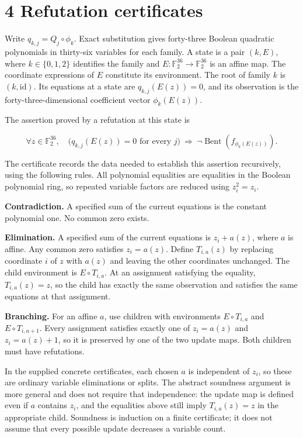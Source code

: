 \documentclass[11pt,a4paper]{article}
\begin{document}
\section*{4 Refutation certificates}

Write $q_{k,j}=Q_j\circ\phi_k$. Exact substitution gives forty-three Boolean quadratic polynomials in thirty-six variables for each family. A state is a pair $(k,E)$, where $k\in\{0,1,2\}$ identifies the family and $E:\mathbb F_2^{36}\to\mathbb F_2^{36}$ is an affine map. The coordinate expressions of $E$ constitute its environment. The root of family $k$ is $(k,\mathrm{id})$. Its equations at a state are $q_{k,j}(E(z))=0$, and its observation is the forty-three-dimensional coefficient vector $\phi_k(E(z))$.

The assertion proved by a refutation at this state is

\[
\forall z\in\mathbb F_2^{36},\quad
\bigl(q_{k,j}(E(z))=0\text{ for every }j\bigr)
\ \Longrightarrow\ \neg\operatorname{Bent}(f_{\phi_k(E(z))}).
\]

The certificate records the data needed to establish this assertion recursively, using the following rules. All polynomial equalities are equalities in the Boolean polynomial ring, so repeated variable factors are reduced using $z_i^2=z_i$.

\textbf{Contradiction.} A specified sum of the current equations is the constant polynomial one. No common zero exists.

\textbf{Elimination.} A specified sum of the current equations is $z_i+a(z)$, where $a$ is affine. Any common zero satisfies $z_i=a(z)$. Define $T_{i,a}(z)$ by replacing coordinate $i$ of $z$ with $a(z)$ and leaving the other coordinates unchanged. The child environment is $E\circ T_{i,a}$. At an assignment satisfying the equality, $T_{i,a}(z)=z$, so the child has exactly the same observation and satisfies the same equations at that assignment.

\textbf{Branching.} For an affine $a$, use children with environments $E\circ T_{i,a}$ and $E\circ T_{i,a+1}$. Every assignment satisfies exactly one of $z_i=a(z)$ and $z_i=a(z)+1$, so it is preserved by one of the two update maps. Both children must have refutations.

In the supplied concrete certificates, each chosen $a$ is independent of $z_i$, so these are ordinary variable eliminations or splits. The abstract soundness argument is more general and does not require that independence: the update map is defined even if $a$ contains $z_i$, and the equalities above still imply $T_{i,a}(z)=z$ in the appropriate child. Soundness is induction on a finite certificate; it does not assume that every possible update decreases a variable count.
\end{document}
